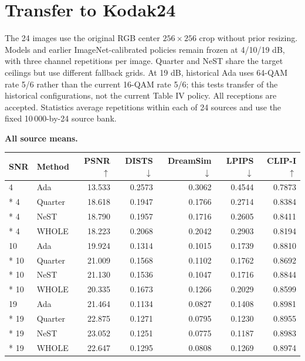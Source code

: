 \documentclass[10pt,letterpaper]{article}
\begin{document}
\section{Transfer to Kodak24}\label{sup:8}
The 24 images use the original RGB center $256\times256$ crop without prior resizing. Models and earlier ImageNet-calibrated policies remain frozen at 4/10/19 dB, with three channel repetitions per image. Quarter and NeST share the target ceilings but use different fallback grids. At 19 dB, historical Ada uses 64-QAM rate 5/6 rather than the current 16-QAM rate 5/6; this tests transfer of the historical configurations, not the current Table IV policy. All receptions are accepted. Statistics average repetitions within each of 24 sources and use the fixed 10\,000-by-24 source bank.

\textbf{All source means.}\par
{\small\setlength{\tabcolsep}{3pt}\renewcommand{\arraystretch}{1.08}
\begin{longtable}{@{}llrrrrr@{}}\toprule
SNR & Method & PSNR $\uparrow$ & DISTS $\downarrow$ & DreamSim $\downarrow$ & LPIPS $\downarrow$ & CLIP-I $\uparrow$\\\midrule\endhead
4 & Ada & 13.533 & 0.2573 & 0.3062 & 0.4544 & 0.7873\\*
4 & Quarter & 18.618 & 0.1947 & 0.1766 & 0.2714 & 0.8384\\*
4 & NeST & 18.790 & 0.1957 & 0.1716 & 0.2605 & 0.8411\\*
4 & WHOLE & 18.223 & 0.2068 & 0.2042 & 0.2903 & 0.8194\\
10 & Ada & 19.924 & 0.1314 & 0.1015 & 0.1739 & 0.8810\\*
10 & Quarter & 21.009 & 0.1568 & 0.1102 & 0.1762 & 0.8692\\*
10 & NeST & 21.130 & 0.1536 & 0.1047 & 0.1716 & 0.8844\\*
10 & WHOLE & 20.335 & 0.1673 & 0.1266 & 0.2029 & 0.8599\\
19 & Ada & 21.464 & 0.1134 & 0.0827 & 0.1408 & 0.8981\\*
19 & Quarter & 22.875 & 0.1271 & 0.0795 & 0.1230 & 0.8955\\*
19 & NeST & 23.052 & 0.1251 & 0.0775 & 0.1187 & 0.8983\\*
19 & WHOLE & 22.647 & 0.1295 & 0.0808 & 0.1269 & 0.8974\\
\bottomrule\end{longtable}}
\end{document}
